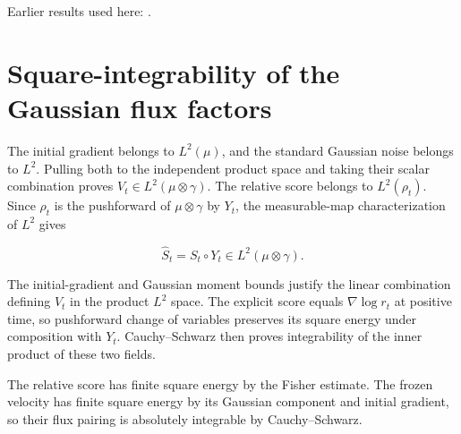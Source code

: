 \documentclass[11pt,a4paper]{article}
\begin{document}
Earlier results used here: \cite[Section~3.34.1]{LangevinLean2026ULASC}.

\section{\texorpdfstring{Square-integrability of the Gaussian flux factors}{Square-integrability of the Gaussian flux factors}}


The initial gradient belongs to \(L^2(\mu)\), and the standard Gaussian noise belongs to \(L^2\). Pulling both to the independent product space and taking their scalar combination proves \(V_t\in L^2(\mu\otimes\gamma)\). The relative score belongs to \(L^2(\rho_t)\). Since \(\rho_t\) is the pushforward of \(\mu\otimes\gamma\) by \(Y_t\), the measurable-map characterization of \(L^2\) gives

\[\widehat S_t=S_t\circ Y_t\in L^2(\mu\otimes\gamma).\]

The initial-gradient and Gaussian moment bounds justify the linear combination defining \(V_t\) in the product \(L^2\) space. The explicit score equals \(\nabla\log r_t\) at positive time, so pushforward change of variables preserves its square energy under composition with \(Y_t\). Cauchy–Schwarz then proves integrability of the inner product of these two fields.



The relative score has finite square energy by the Fisher estimate. The frozen velocity has finite square energy by its Gaussian component and initial gradient, so their flux pairing is absolutely integrable by Cauchy–Schwarz.
\end{document}
